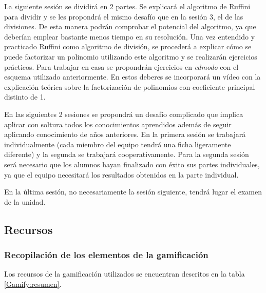\label{ResumenSesion6}
%
La siguiente sesión se dividirá en 2 partes. 
%
Se explicará el algoritmo de Ruffini para dividir y se les propondrá el mismo desafío que en la sesión 3, el de las divisiones.
%
De esta manera podrán comprobar el potencial del algoritmo, ya que deberían emplear bastante menos tiempo en su resolución.
%
Una vez entendido y practicado Ruffini como algoritmo de división, se procederá a explicar cómo se puede factorizar un polinomio utilizando este algoritmo y se realizarán ejercicios prácticos.
%
Para trabajar en casa se propondrán ejercicios en \textit{edmodo} con el esquema utilizado anteriormente.
%
En estos deberes se incorporará un vídeo con la explicación teórica sobre la factorización de polinomios con coeficiente principal distinto de 1.


\label{ResumenSesion7}
%
\label{ResumenSesion8}
%
En las siguientes 2 sesiones se propondrá un desafío complicado que implica aplicar con soltura todos los conocimientos aprendidos además de seguir aplicando conocimiento de años anteriores.
%
En la primera sesión se trabajará individualmente (cada miembro del equipo tendrá una ficha ligeramente diferente) y la segunda se trabajará cooperativamente.
%
Para la segunda sesión será necesario que los alumnos hayan finalizado con éxito sus partes individuales, ya que el equipo necesitará los resultados obtenidos en la parte individual.

\label{ResumenSesion9}
%
En la última sesión, no necesariamente la sesión siguiente, tendrá lugar el examen de la unidad.



\subsection{Recursos}

\subsubsection{Recopilación de los elementos de la gamificación }

Los recursos de la gamificación utilizados se encuentran descritos en la tabla \ref{Gamify:resumen}.

